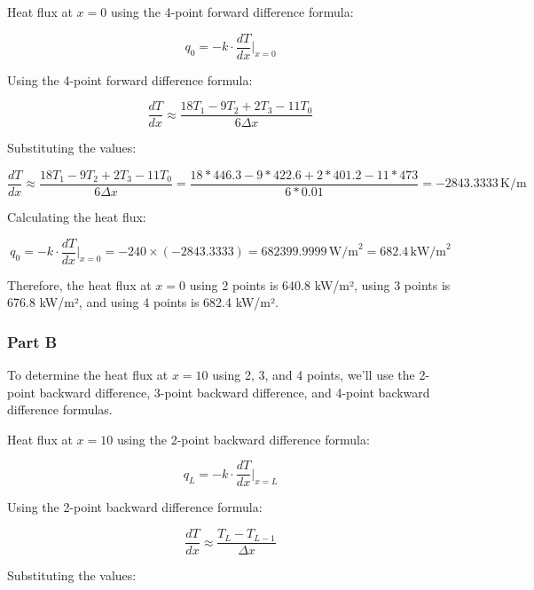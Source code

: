 \documentclass[12pt, a4paper]{article}
\numberwithin{equation}{section}
\begin{document}
Heat flux at \(x = 0\) using the 4-point forward difference formula:

\begin{equation}
q_0 = -k \cdot \frac{d T}{d x}\Bigg|_{x=0}
\end{equation}

Using the 4-point forward difference formula:

\begin{equation}
\frac{d T}{d x} \approx \frac{18T_1 - 9T_2 + 2T_3 - 11T_0}{6\Delta x}
\end{equation}

Substituting the values:

\begin{equation}
\frac{dT}{dx} \approx \frac{18T_1 - 9T_2 + 2T_3 - 11T_0}{6\Delta x} = \frac{18*446.3 - 9*422.6 + 2*401.2 - 11*473}{6*0.01} = -2843.3333\, \text{K/m}
\end{equation}

Calculating the heat flux:

\begin{equation}
q_0 = -k \cdot \frac{dT}{dx}\Bigg|_{x=0} = -240 \times (-2843.3333) = 682399.9999\, \text{W/m}^2 = 682.4\, \text{kW/m}^2
\end{equation}

Therefore, the heat flux at \(x = 0\) using 2 points is 640.8 kW/m², using 3 points is 676.8 kW/m², and using 4 points is 682.4 kW/m².

\subsubsection{Part B}

To determine the heat flux at $x = 10$ using 2, 3, and 4 points, we'll use the 2-point backward difference, 3-point backward difference, and 4-point backward difference formulas.

Heat flux at $x = 10$ using the 2-point backward difference formula:


\begin{equation}
q_L = -k \cdot \frac{d T}{d x}\Bigg|_{x=L}
\end{equation}

Using the 2-point backward difference formula:

\begin{equation}
\frac{d T}{d x} \approx \frac{T_L - T_{L-1}}{\Delta x}
\end{equation}

Substituting the values:
\end{document}
